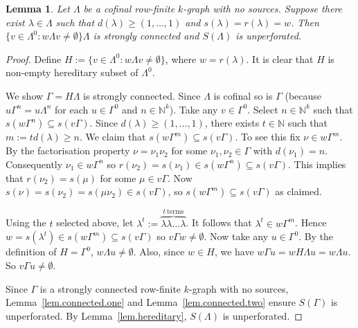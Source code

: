 \documentclass[a4paper, 12pt]{amsart}
\numberwithin{equation}{section}
\newcounter{theorem}
\newtheorem{lemma}[theorem]{Lemma}
\theoremstyle{remark}
\theoremstyle{definition}
\begin{document}
\begin{lemma}\label{lem.loop}
Let $\Lambda$ be a cofinal row-finite $k$-graph with no sources. Suppose there exist
$\lambda\in \Lambda$ such that $d(\lambda)\geq (1,\dots,1)$ and
$s(\lambda)=r(\lambda)=w$. Then $\{v\in \Lambda^0\colon w\Lambda v\neq
\emptyset\}\Lambda$ is strongly connected and $S(\Lambda)$ is unperforated.
\end{lemma}
\begin{proof}
Define $H:=\{v\in \Lambda^0: w\Lambda v\neq \emptyset\}$, where $w=r(\lambda)$. It is
clear that $H$ is non-empty hereditary subset of $\Lambda^0$.

We show $\Gamma=H\Lambda$ is strongly connected. Since $\Lambda$ is cofinal so is
$\Gamma$ (because $u\Gamma^n=u\Lambda^n$ for each $u\in \Gamma^0$ and $n\in {\mathbb{N}}^k$). Take
any $v\in \Gamma^0$. Select $n\in {\mathbb{N}}^k$ such that $s(w\Gamma^n)\subseteq s(v\Gamma)$.
Since $d(\lambda)\geq (1,\dots,1)$, there exists $t\in {\mathbb{N}}$ such that $m:=td(\lambda)\geq
n$. We claim that $s(w\Gamma^m)\subseteq s(v\Gamma)$. To see this fix $\nu\in w\Gamma^m$. By the
factorisation property $\nu=\nu_1\nu_2$ for some $\nu_1,\nu_2\in \Gamma$ with
$d(\nu_1)=n$. Consequently $\nu_1\in w\Gamma^n$ so $r(\nu_2)=s(\nu_1)\in
s(w\Gamma^n)\subseteq s(v\Gamma)$. This implies that $r(\nu_2)=s(\mu)$ for some $\mu\in
v\Gamma$. Now $s(\nu)=s(\nu_2)=s(\mu\nu_2)\in s(v\Gamma)$, so $s(w\Gamma^m)\subseteq
s(v\Gamma)$ as claimed.

Using the $t$ selected above, let $\lambda^t:=\overbrace{\lambda\lambda\dots\lambda}^{t \ \textrm{terms}}$. It follows that $\lambda^t\in w\Gamma^m$. Hence
$w=s(\lambda^t)\in s(w\Gamma^m)\subseteq s(v\Gamma)$ so $v\Gamma w\neq \emptyset$. Now
take any $u\in \Gamma^0$. By the definition of $H=\Gamma^0$, $w\Lambda u\neq \emptyset$.
Also, since $w\in H$, we have $w\Gamma u=wH\Lambda u =w\Lambda u$. So $v\Gamma u \neq
\emptyset$.

Since $\Gamma$ is a strongly connected row-finite $k$-graph with no sources,
Lemma~\ref{lem.connected.one} and Lemma~\ref{lem.connected.two} ensure $S(\Gamma)$ is
unperforated. By Lemma~\ref{lem.hereditary}, $S(\Lambda)$ is unperforated.
\end{proof}
\end{document}
